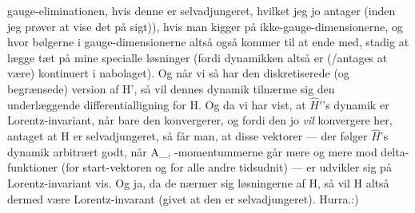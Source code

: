 \documentclass{report}
\begin{document}
gauge-eliminationen, hvis denne er selvadjungeret, hvilket jeg jo antager (inden jeg prøver at vise det på sigt)), hvis man kigger på ikke-gauge-dimensionerne, og hvor bølgerne i gauge-dimensionerne altså også kommer til at ende med, stadig at lægge tæt på mine specialle løsninger (fordi dynamikken altså er (/antages at være) kontinuert i nabolaget). Og når vi så har den diskretiserede (og begrænsede) version af \hat H', så vil dennes dynamik tilnærme sig den underlæggende differentialligning for \hat H. Og da vi har vist, at $\hat H'$'s dynamik er Lorentz-invariant, når bare den konvergerer, og fordi den jo \emph{vil} konvergere her, antaget at \hat H er selvadjungeret, så får man, at disse vektorer --- der følger $\hat H$'s dynamik arbitrært godt, når A_{\parallel, }-momentummerne går mere og mere mod delta-funktioner (for start-vektoren og for alle andre tidsudnit) --- er udvikler sig på Lorentz-invariant vis. Og ja, da de nærmer sig løsningerne af \hat H, så vil \hat H altså dermed være Lorentz-invarant (givet at den er selvadjungeret). Hurra.:) 
\end{document}
